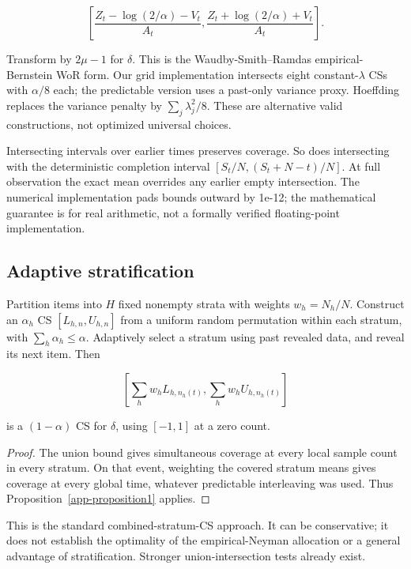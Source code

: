 \begin{equation}\label{eq:proofs-3}
\left[\frac{Z_t-\log(2/\alpha)-V_t}{A_t},\frac{Z_t+\log(2/\alpha)+V_t}{A_t}\right].
\end{equation}

Transform by \(2\mu-1\) for \(\delta\). This is the Waudby-Smith--Ramdas empirical-Bernstein WoR form. Our grid implementation intersects eight constant-\(\lambda\) CSs with \(\alpha/8\) each; the predictable version uses a past-only variance proxy. Hoeffding replaces the variance penalty by \(\sum_j\lambda_j^2/8\). These are alternative valid constructions, not optimized universal choices.

Intersecting intervals over earlier times preserves coverage. So does intersecting with the deterministic completion interval \([S_t/N,(S_t+N-t)/N]\). At full observation the exact mean overrides any earlier empty intersection. The numerical implementation pads bounds outward by 1e-12; the mathematical guarantee is for real arithmetic, not a formally verified floating-point implementation.

\subsection{Adaptive stratification}\label{theory:4}

Partition items into \(H\) fixed nonempty strata with weights \(w_h=N_h/N\). Construct an \(\alpha_h\) CS \([L_{h,n},U_{h,n}]\) from a uniform random permutation within each stratum, with \(\sum_h\alpha_h\le\alpha\). Adaptively select a stratum using past revealed data, and reveal its next item. Then

\begin{equation}\label{eq:proofs-4}
\left[\sum_h w_h L_{h,n_h(t)},\sum_h w_h U_{h,n_h(t)}\right]
\end{equation}

is a \((1-\alpha)\) CS for \(\delta\), using \([-1,1]\) at a zero count.

\begin{proof} The union bound gives simultaneous coverage at every local sample count in every stratum. On that event, weighting the covered stratum means gives coverage at every global time, whatever predictable interleaving was used. Thus Proposition~\ref{app-proposition1} applies. \end{proof}

This is the standard combined-stratum-CS approach. It can be conservative; it does not establish the optimality of the empirical-Neyman allocation or a general advantage of stratification. Stronger union-intersection tests already exist.

